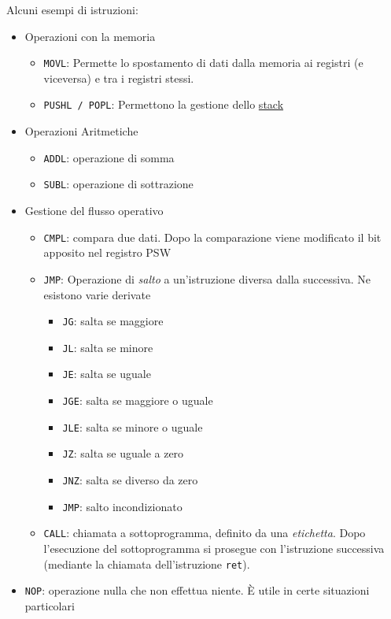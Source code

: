 \documentclass[a4paper,11pt,oneside]{book}
\begin{document}
\noindent Alcuni esempi di istruzioni:
\begin{itemize}
    \item Operazioni con la memoria
    \begin{itemize}
        \item \texttt{MOVL}: Permette lo spostamento di dati dalla memoria ai registri (e viceversa) e tra i registri stessi.
        \item \texttt{PUSHL / POPL}: Permettono la gestione dello \underline{stack}
    \end{itemize}
    \item Operazioni Aritmetiche
    \begin{itemize}
        \item \texttt{ADDL}: operazione di somma
        \item \texttt{SUBL}: operazione di sottrazione
    \end{itemize}
    \item Gestione del flusso operativo
    \begin{itemize}
        \item \texttt{CMPL}: compara due dati. Dopo la comparazione viene modificato il bit apposito nel registro PSW
        \item \texttt{JMP}: Operazione di \emph{salto} a un'istruzione diversa dalla successiva. Ne esistono varie derivate
        \begin{itemize}
            \item \texttt{JG}: salta se maggiore
            \item \texttt{JL}: salta se minore
            \item \texttt{JE}: salta se uguale
            \item \texttt{JGE}: salta se maggiore o uguale
            \item \texttt{JLE}: salta se minore o uguale
            \item \texttt{JZ}: salta se uguale a zero
            \item \texttt{JNZ}: salta se diverso da zero
            \item \texttt{JMP}: salto incondizionato
        \end{itemize}
        \item \texttt{CALL}: chiamata a sottoprogramma, definito da una \emph{etichetta}. Dopo l'esecuzione del sottoprogramma si prosegue con l'istruzione successiva (mediante la chiamata dell'istruzione \texttt{ret}).
    \end{itemize}
    \item \texttt{NOP}: operazione nulla che non effettua niente. È utile in certe situazioni particolari
\end{itemize}
\end{document}
